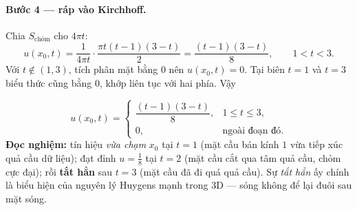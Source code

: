 \paragraph{Bước 4 --- ráp vào Kirchhoff.}\leavevmode

Chia $S_{\text{chỏm}}$ cho $4\pi t$:
\[
  u(x_0,t)=\frac{1}{4\pi t}\cdot\frac{\pi t(t-1)(3-t)}{2}=\frac{(t-1)(3-t)}{8},\qquad 1<t<3.
\]
Với $t\notin(1,3)$, tích phân mặt bằng $0$ nên $u(x_0,t)=0$. Tại biên $t=1$ và $t=3$ biểu thức cũng bằng $0$, khớp liên tục với hai phía. Vậy
\begin{nhobox}
\[
  u(x_0,t)=\begin{cases}\dfrac{(t-1)(3-t)}{8}, & 1\le t\le 3,\\[6pt] 0, & \text{ngoài đoạn đó}.\end{cases}
\]
\textbf{Đọc nghiệm:} tín hiệu \emph{vừa chạm} $x_0$ tại $t=1$ (mặt cầu bán kính $1$ vừa tiếp xúc quả cầu dữ liệu); đạt đỉnh $u=\tfrac{1}{8}$ tại $t=2$ (mặt cầu cắt qua tâm quả cầu, chỏm cực đại); rồi \textbf{tắt hẳn} sau $t=3$ (mặt cầu đã đi quá quả cầu). Sự \emph{tắt hẳn} ấy chính là biểu hiện của nguyên lý Huygens mạnh trong $3$D --- sóng không để lại đuôi sau mặt sóng.
\end{nhobox}
